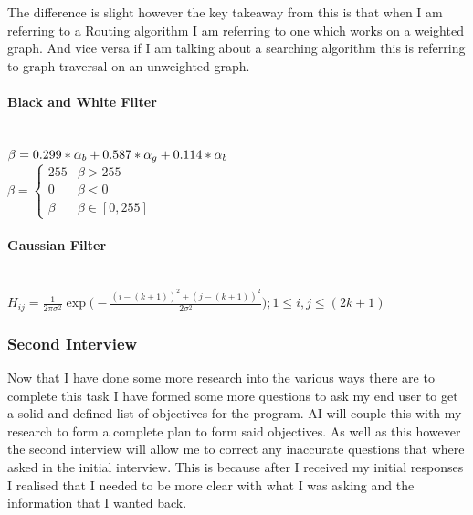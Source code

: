 \begin{flushleft}
            \bk

            The difference is slight however the key takeaway from this is that when I am referring to a Routing algorithm I am referring to one which works on a weighted graph. And vice versa if I am
            talking about a searching algorithm this is referring to graph traversal on an unweighted graph.

            \bk

            \paragraph{Black and White Filter}
            \mbox{} \\
            
            \bk
            $
                \mathlarger {
                    \beta = 0.299 * \alpha_{b} + 0.587 * \alpha_{g} + 0.114 * \alpha_{b}
                }
            $
            \bk
            \\
            \bk
            $
                \beta = \begin{cases}
                    255 & \beta > 255 \\
                    0 & \beta < 0 \\
                    \beta & \beta \in [0, 255]
                \end{cases}
            $
            \bk

            \bk
            \paragraph{Gaussian Filter}
            \mbox{} \\
            
            \bk
            $
                H_{ij} = \frac{1}{2\pi\sigma^{2}} \exp \bigg(-\frac{(i - (k + 1))^{2} + (j - (k + 1))^{2}}{2\sigma^{2}}\bigg);1\leq i, j \leq(2k+1)
            $
            \bk
            \\
            \bk

            \subsubsection{Second Interview}
            \large
            Now that I have done some more research into the various ways there are to complete this task I have formed some more questions to ask my end user to get a solid and
            defined list of objectives for the program. AI will couple this with my research to form a complete plan to form said objectives. As well as this however the second interview
            will allow me to correct any inaccurate questions that where asked in the initial interview. This is because after I received my initial responses I realised that I
            needed to be more clear with what I was asking and the information that I wanted back. \\
            \bk
            

\end{flushleft}
